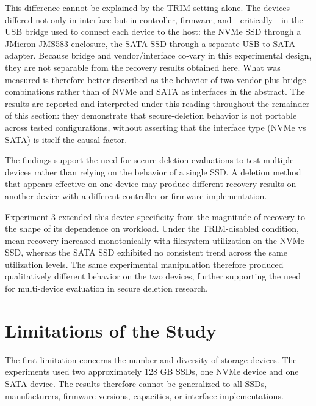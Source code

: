This difference cannot be explained by the TRIM setting alone. The devices differed not only in interface but in controller, firmware, and - critically - in the USB 
bridge used to connect each device to the host: the NVMe SSD through a JMicron JMS583 enclosure, the SATA SSD through a separate USB-to-SATA adapter. Because bridge and 
vendor/interface co-vary in this experimental design, they are not separable from the recovery results obtained here. What was measured is therefore better described as 
the behavior of two vendor-plus-bridge combinations rather than of NVMe and SATA as interfaces in the abstract. The results are reported and interpreted under this 
reading throughout the remainder of this section: they demonstrate that secure-deletion behavior is not portable across tested configurations, without asserting that 
the interface type (NVMe vs SATA) is itself the causal factor. 

The findings support the need for secure deletion evaluations to test multiple devices rather than relying on the behavior of a single SSD. A deletion method that 
appears effective on one device may produce different recovery results on another device with a different controller or firmware implementation.

Experiment 3 extended this device-specificity from the magnitude of recovery to the shape of its dependence on workload. Under the TRIM-disabled condition, mean 
recovery increased monotonically with filesystem utilization on the NVMe SSD, whereas the SATA SSD exhibited no consistent trend across the same utilization levels. 
The same experimental manipulation therefore produced qualitatively different behavior on the two devices, further supporting the need for multi-device evaluation in 
secure deletion research.

\section{Limitations of the Study}

The first limitation concerns the number and diversity of storage devices. The experiments used two approximately 128 GB SSDs, one NVMe device and one SATA device. The 
results therefore cannot be generalized to all SSDs, manufacturers, firmware versions, capacities, or interface implementations.

